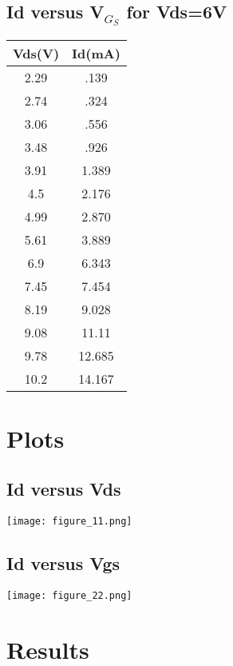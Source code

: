\documentclass[12pt]{extarticle}
\begin{document}
\subsection{Id versus V$_G_S$ for Vds=6V}
\begin{center}
 \begin{tabular}{|| c | c||} 
 \hline
 Vds(V) & Id(mA) \\ [0.5ex] 
 \hline\hline
 2.29&.139\\
 \hline
 2.74&.324\\
 \hline
 3.06&.556\\
 \hline
 3.48&.926\\
 \hline
 3.91&1.389\\
 \hline
 4.5&2.176\\
 \hline
 4.99&2.870\\
 \hline
 5.61&3.889\\
 \hline
 6.9&6.343\\
 \hline
 7.45&7.454\\
 \hline
 8.19&9.028\\
 \hline
 9.08&11.11\\
 \hline
 9.78&12.685\\
 \hline
 10.2&14.167\\
 \hline
 


\end{tabular}
\end{center}
 
 
 

\section*{Plots}

\subsection*{Id versus Vds}
\begin{center}
    \texttt{[image: figure\_11.png]}
\end{center}

\subsection*{Id versus Vgs}
\begin{center}
    \texttt{[image: figure\_22.png]}
\end{center}

\section*{Results}
\end{document}
